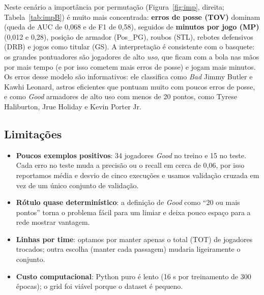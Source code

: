 \documentclass[11pt,a4paper]{article}
\begin{document}
Neste cenário a importância por permutação (Figura~\ref{fig:imp}, direita; Tabela~\ref{tab:impB}) é muito
mais concentrada: \textbf{erros de posse (TOV)} dominam (queda de AUC de 0,068 e de F1 de 0,58), seguidos de
\textbf{minutos por jogo (MP)} (0,012 e 0,28), posição de armador (Pos\_PG), roubos (STL), rebotes defensivos
(DRB) e jogos como titular (GS). A interpretação é consistente com o basquete: os grandes pontuadores são
jogadores de alto \emph{uso}, que ficam com a bola nas mãos por mais tempo (e por isso cometem mais erros de
posse) e jogam mais minutos. Os erros desse modelo são informativos: ele classifica como \emph{Bad} Jimmy Butler e
Kawhi Leonard, astros eficientes que pontuam muito com poucos erros de posse, e como \emph{Good} armadores de alto
uso com menos de 20 pontos, como Tyrese Haliburton, Jrue Holiday e Kevin Porter Jr.

\subsection{Limitações}
\begin{itemize}
  \item \textbf{Poucos exemplos positivos}: 34 jogadores \emph{Good} no treino e 15 no teste. Cada erro no teste muda
        a precisão ou o recall em cerca de 0,06, por isso reportamos média e desvio de cinco execuções e usamos
        validação cruzada em vez de um único conjunto de validação.
  \item \textbf{Rótulo quase determinístico}: a definição de \emph{Good} como ``20 ou mais pontos'' torna o problema
        fácil para um limiar e deixa pouco espaço para a rede mostrar vantagem.
  \item \textbf{Linhas por time}: optamos por manter apenas o total (TOT) de jogadores trocados; outra escolha
        (manter cada passagem) mudaria ligeiramente o conjunto.
  \item \textbf{Custo computacional}: Python puro é lento (16 s por treinamento de 300 épocas); o grid foi viável
        porque o dataset é pequeno.
\end{itemize}
\end{document}
